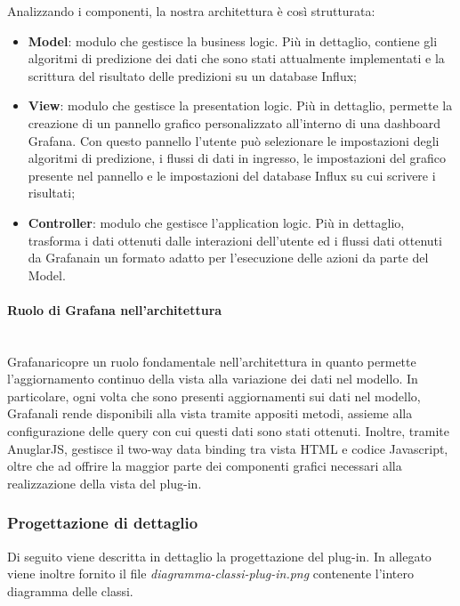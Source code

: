 Analizzando i componenti, la nostra architettura è così strutturata: 
\begin{itemize}
	\item \textbf{Model}: modulo che gestisce la business logic\glo. Più in dettaglio, contiene gli algoritmi di predizione dei dati che sono stati attualmente implementati e la scrittura del risultato delle predizioni su un database Influx;
	\item \textbf{View}: modulo che gestisce la presentation logic. Più in dettaglio, permette la creazione di un pannello grafico personalizzato all'interno di una dashboard Grafana\glo. Con questo pannello l'utente può selezionare le impostazioni degli algoritmi di predizione, i flussi di dati in ingresso, le impostazioni del grafico presente nel pannello e le impostazioni del database Influx su cui scrivere i risultati;
	\item \textbf{Controller}: modulo che gestisce l'application logic. Più in dettaglio, trasforma i dati ottenuti dalle interazioni dell'utente ed i flussi dati ottenuti da Grafana\glosp in un formato adatto per l'esecuzione delle azioni da parte del Model.
\end{itemize}
\paragraph{Ruolo di Grafana nell'architettura} \mbox{}\\ [1mm]
Grafana\glosp ricopre un ruolo fondamentale nell'architettura in quanto permette l'aggiornamento continuo della vista alla variazione dei dati nel modello. In particolare, ogni volta che sono presenti aggiornamenti sui dati nel modello, Grafana\glosp li rende disponibili alla vista tramite appositi metodi, assieme alla configurazione delle query con cui questi dati sono stati ottenuti. Inoltre, tramite AnuglarJS, gestisce il two-way data binding tra vista HTML e codice Javascript, oltre che ad offrire la maggior parte dei componenti grafici necessari alla realizzazione della vista del plug-in.
\subsubsection{Progettazione di dettaglio}
Di seguito viene descritta in dettaglio la progettazione del plug-in. In allegato viene inoltre fornito il file \textit{diagramma-classi-plug-in.png} contenente l'intero diagramma delle classi.
